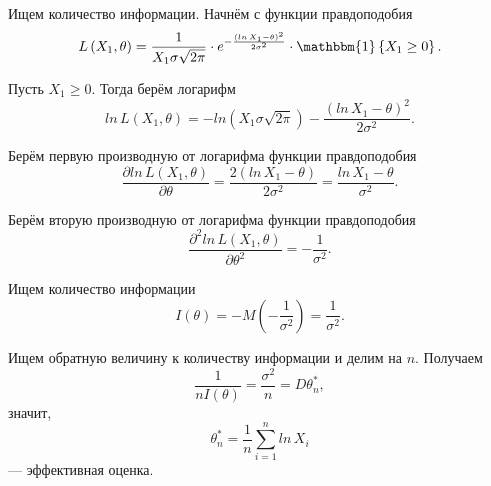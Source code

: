 Ищем количество информации.
Начнём с функции правдоподобия
$$L \left( X_1, \theta \right) =
  \frac{1}{X_1 \sigma \sqrt{2 \pi }} \cdot
  e^{- \frac{ \left( ln \, X_1 - \theta \right)^2}{2 \sigma^2}} \cdot
  \mathbbm{1} \left\{ X_1 \geq 0 \right\}.$$

Пусть $X_1 \geq 0$.
Тогда берём логарифм
$$ln \, L \left( X_1, \theta \right) =
  -ln \left( X_1 \sigma \sqrt{2 \pi } \right) -
  \frac{ \left( ln \, X_1 - \theta \right)^2}{2 \sigma^2}.$$

Берём первую производную от логарифма функции правдоподобия
$$ \frac{ \partial ln \, L \left( X_1, \theta \right) }{ \partial \theta } =
  \frac{2 \left( ln \, X_1 - \theta \right) }{2 \sigma^2} =
  \frac{ln \, X_1 - \theta }{ \sigma^2}.$$

Берём вторую производную от логарифма функции правдоподобия
$$ \frac{ \partial^2 ln \, L \left( X_1, \theta \right) }{ \partial \theta^2} =
  - \frac{1}{ \sigma^2}.$$

Ищем количество информации
$$I \left( \theta \right) =
  -M \left( - \frac{1}{ \sigma^2} \right) =
  \frac{1}{ \sigma^2}.$$

Ищем обратную величину к количеству информации и делим на $n$.
Получаем
$$ \frac{1}{nI \left( \theta \right) } =
  \frac{ \sigma^2}{n} =
  D \theta_n^*,$$
значит,
$$ \theta_n^* =
  \frac{1}{n} \sum \limits_{i = 1}^n ln \, X_i$$
--- эффективная оценка.
